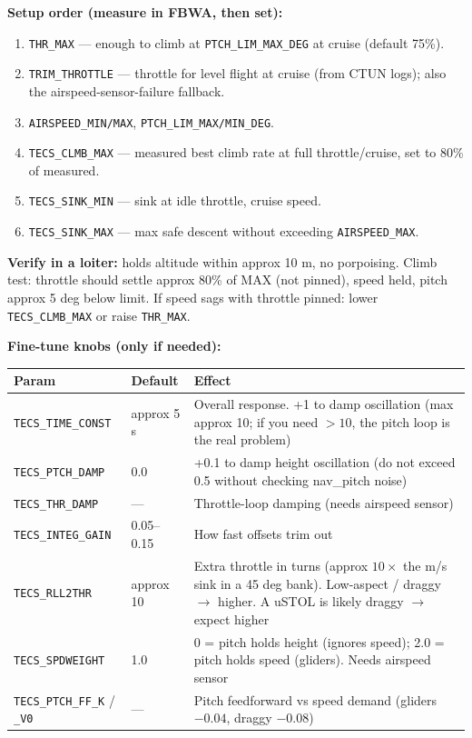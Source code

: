\documentclass[11pt,a4paper]{article}
\newcommand{\pp}[1]{\texttt{#1}} %
\begin{document}
\textbf{Setup order (measure in FBWA, then set):}
\begin{enumerate}[leftmargin=1.6em]
  \item \pp{THR\_MAX} --- enough to climb at \pp{PTCH\_LIM\_MAX\_DEG} at cruise
  (default 75\%).
  \item \pp{TRIM\_THROTTLE} --- throttle for level flight at cruise (from CTUN
  logs); also the airspeed-sensor-failure fallback.
  \item \pp{AIRSPEED\_MIN/MAX}, \pp{PTCH\_LIM\_MAX/MIN\_DEG}.
  \item \pp{TECS\_CLMB\_MAX} --- measured best climb rate at full throttle/cruise,
  set to 80\% of measured.
  \item \pp{TECS\_SINK\_MIN} --- sink at idle throttle, cruise speed.
  \item \pp{TECS\_SINK\_MAX} --- max safe descent without exceeding
  \pp{AIRSPEED\_MAX}.
\end{enumerate}

\textbf{Verify in a loiter:} holds altitude within approx 10 m, no porpoising.
Climb test: throttle should settle approx 80\% of MAX (not pinned), speed held,
pitch approx 5 deg below limit. If speed sags with throttle pinned: lower
\pp{TECS\_CLMB\_MAX} or raise \pp{THR\_MAX}.

\textbf{Fine-tune knobs (only if needed):}

\begin{longtable}{@{}p{3.4cm}p{2.0cm}p{9.4cm}@{}}
\toprule
\textbf{Param} & \textbf{Default} & \textbf{Effect}\\
\midrule
\endhead
\pp{TECS\_TIME\_CONST} & approx 5 s & Overall response. +1 to damp oscillation (max approx 10; if you need $>10$, the pitch loop is the real problem)\\
\pp{TECS\_PTCH\_DAMP} & 0.0 & +0.1 to damp height oscillation (do not exceed 0.5 without checking nav\_pitch noise)\\
\pp{TECS\_THR\_DAMP} & --- & Throttle-loop damping (needs airspeed sensor)\\
\pp{TECS\_INTEG\_GAIN} & 0.05--0.15 & How fast offsets trim out\\
\pp{TECS\_RLL2THR} & approx 10 & Extra throttle in turns (approx $10\times$ the m/s sink in a 45 deg bank). Low-aspect / draggy $\rightarrow$ higher. A uSTOL is likely draggy $\rightarrow$ expect higher\\
\pp{TECS\_SPDWEIGHT} & 1.0 & 0 = pitch holds height (ignores speed); 2.0 = pitch holds speed (gliders). Needs airspeed sensor\\
\pp{TECS\_PTCH\_FF\_K} / \pp{\_V0} & --- & Pitch feedforward vs speed demand (gliders $-0.04$, draggy $-0.08$)\\
\bottomrule
\end{longtable}
\end{document}
